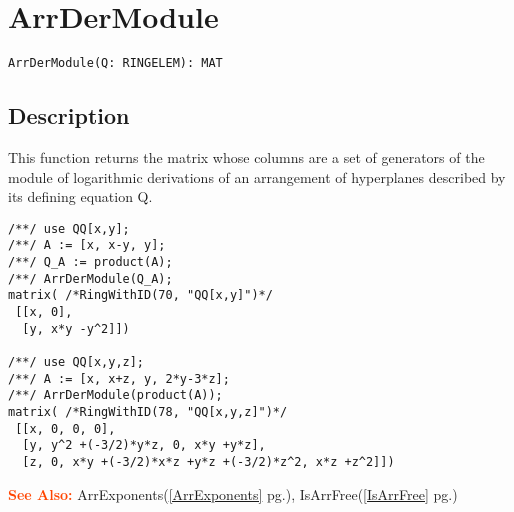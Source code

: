 \documentclass[a4paper]{mybook}
\newenvironment{command}{}{} %
\newcommand\SeeAlso{\par\textcolor{OrangeRed}{\textbf{\large See Also: }}}
\begin{document}
\section{ArrDerModule}
\label{ArrDerModule}
\begin{command} %


\begin{Verbatim}[label=syntax, rulecolor=\color{MidnightBlue},
frame=single]
ArrDerModule(Q: RINGELEM): MAT 
\end{Verbatim}


\subsection*{Description}

This function returns the matrix whose columns are a set of generators of the module of logarithmic derivations of an arrangement of hyperplanes described by its defining equation Q.
\begin{Verbatim}[label=example, rulecolor=\color{PineGreen}, frame=single]
/**/ use QQ[x,y];	
/**/ A := [x, x-y, y];
/**/ Q_A := product(A);	
/**/ ArrDerModule(Q_A);
matrix( /*RingWithID(70, "QQ[x,y]")*/
 [[x, 0],
  [y, x*y -y^2]])

/**/ use QQ[x,y,z];    
/**/ A := [x, x+z, y, 2*y-3*z];
/**/ ArrDerModule(product(A));
matrix( /*RingWithID(78, "QQ[x,y,z]")*/
 [[x, 0, 0, 0],
  [y, y^2 +(-3/2)*y*z, 0, x*y +y*z],
  [z, 0, x*y +(-3/2)*x*z +y*z +(-3/2)*z^2, x*z +z^2]])	
\end{Verbatim}


\SeeAlso %
  ArrExponents(\ref{ArrExponents} pg.\pageref{ArrExponents}), 
    IsArrFree(\ref{IsArrFree} pg.\pageref{IsArrFree})
\end{command} %
\end{document}
